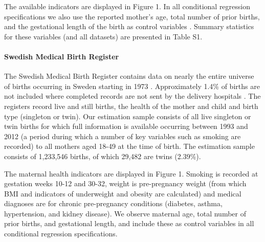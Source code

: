 \documentclass[12pt]{article}
\begin{document}
The available indicators are displayed in Figure 1. In all conditional regression specifications we also use the reported mother's age, total number of prior births, and the gestational length of the birth as control variables \cite{Hall2003}.  Summary statistics for these variables (and all datasets) are presented in Table S1.
  

\paragraph{Swedish Medical Birth Register}
The Swedish Medical Birth Register contains data on nearly the entire universe of births occurring in Sweden starting in 1973 \cite{EPC2003}.  Approximately 1.4\% of births are not included where completed records are not sent by the delivery hospitals \cite{EPC2003}. The registers record live and still births, the health of the mother and child and birth type (singleton or twin).  Our estimation sample consists of all live singleton or twin births for which full information is available occurring between 1993 and 2012 (a period during which a number of key variables such as smoking are recorded) to all mothers aged 18-49 at the time of birth.  The estimation sample consists of 1,233,546 births, of which 29,482 are twins (2.39\%). 

The maternal health indicators are displayed in Figure 1. Smoking is recorded at gestation weeks 10-12 and 30-32, weight is pre-pregnancy weight (from which BMI and indicators of underweight and obesity are calculated) and medical diagnoses are for chronic pre-pregnancy conditions (diabetes, asthma, hypertension, and kidney disease). We observe maternal age, total number of prior births, and gestational length, and include these as control variables in all conditional regression specifications.
\end{document}
